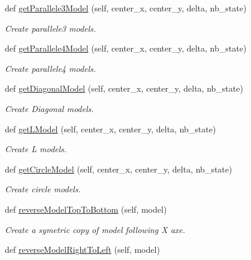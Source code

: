 \begin{DoxyCompactItemize}
def \mbox{\hyperlink{classDatasetManager_1_1DatasetManager_a700d73380b9e8ef82c113d6d12a22122}{get\+Parallele3\+Model}} (self, center\+\_\+x, center\+\_\+y, delta, nb\+\_\+state)
\begin{DoxyCompactList}\small\item\em Create parallele3 models. \end{DoxyCompactList}\item 
def \mbox{\hyperlink{classDatasetManager_1_1DatasetManager_a0d45611b711b9157556bff7b8873808b}{get\+Parallele4\+Model}} (self, center\+\_\+x, center\+\_\+y, delta, nb\+\_\+state)
\begin{DoxyCompactList}\small\item\em Create parallele4 models. \end{DoxyCompactList}\item 
def \mbox{\hyperlink{classDatasetManager_1_1DatasetManager_a12c6f3d08fa02b6fc21ba3e7e4888b09}{get\+Diagonal\+Model}} (self, center\+\_\+x, center\+\_\+y, delta, nb\+\_\+state)
\begin{DoxyCompactList}\small\item\em Create Diagonal models. \end{DoxyCompactList}\item 
def \mbox{\hyperlink{classDatasetManager_1_1DatasetManager_abc53d79472bd2d226ef1e011e6048c2e}{get\+L\+Model}} (self, center\+\_\+x, center\+\_\+y, delta, nb\+\_\+state)
\begin{DoxyCompactList}\small\item\em Create L models. \end{DoxyCompactList}\item 
def \mbox{\hyperlink{classDatasetManager_1_1DatasetManager_a775d6b4eeebf79ff9a5794e65d63504a}{get\+Circle\+Model}} (self, center\+\_\+x, center\+\_\+y, delta, nb\+\_\+state)
\begin{DoxyCompactList}\small\item\em Create circle models. \end{DoxyCompactList}\item 
def \mbox{\hyperlink{classDatasetManager_1_1DatasetManager_aa80b207897d9adf3b805d0185bff4448}{reverse\+Model\+Top\+To\+Bottom}} (self, model)
\begin{DoxyCompactList}\small\item\em Create a symetric copy of model following X axe. \end{DoxyCompactList}\item 
def \mbox{\hyperlink{classDatasetManager_1_1DatasetManager_adcd554118e14f508c09e5a1cec76f5c6}{reverse\+Model\+Right\+To\+Left}} (self, model)

\end{DoxyCompactItemize}
